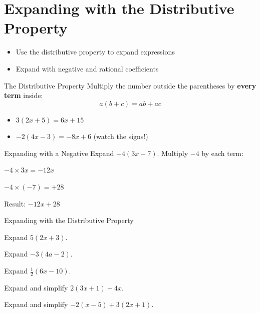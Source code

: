 \section{Expanding with the Distributive Property}

\begin{learningGoals}
\begin{itemize}
    \item Use the distributive property to expand expressions
    \item Expand with negative and rational coefficients
\end{itemize}
\end{learningGoals}

\begin{conceptBox}{The Distributive Property}
Multiply the number outside the parentheses by \textbf{every term} inside:
$$a(b + c) = ab + ac$$
\begin{itemize}[leftmargin=*]
    \item $3(2x + 5) = 6x + 15$
    \item $-2(4x - 3) = -8x + 6$ \quad (watch the signs!)
\end{itemize}
\end{conceptBox}

\begin{sideBySideExample}{Expanding with a Negative}
Expand $-4(3x - 7)$.
\tcblower
Multiply $-4$ by each term:

$-4 \times 3x = -12x$

$-4 \times (-7) = +28$

Result: $-12x + 28$
\end{sideBySideExample}


\begin{practiceBox}{Expanding with the Distributive Property}
\resetProblems

\prob Expand $5(2x + 3)$.

\prob Expand $-3(4a - 2)$.

\prob Expand $\frac{1}{2}(6x - 10)$.

\prob Expand and simplify $2(3x + 1) + 4x$.

\prob Expand and simplify $-2(x - 5) + 3(2x + 1)$.

\end{practiceBox}
